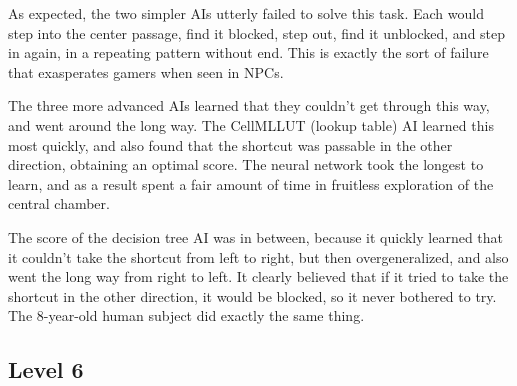 \documentclass{article}
\begin{document}
As expected, the two simpler AIs utterly failed to solve this task.  Each would step into the center passage, find it blocked, step out, find it unblocked, and step in again, in a repeating pattern without end.  This is exactly the sort of failure that exasperates gamers when seen in NPCs.

The three more advanced AIs learned that they couldn't get through this way, and went around the long way.  The CellMLLUT (lookup table) AI learned this most quickly, and also found that the shortcut was passable in the other direction, obtaining an optimal score.  The neural network took the longest to learn, and as a result spent a fair amount of time in fruitless exploration of the central chamber.

The score of the decision tree AI was in between, because it quickly learned that it couldn't take the shortcut from left to right, but then overgeneralized, and also went the long way from right to left.  It clearly believed that if it tried to take the shortcut in the other direction, it would be blocked, so it never bothered to try.  The 8-year-old human subject did exactly the same thing.

\subsection{Level 6}
\end{document}
